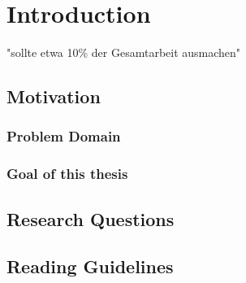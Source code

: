 
\chapter{Introduction} %

\label{ChapterX} %


"sollte etwa 10\% der Gesamtarbeit ausmachen"

\section{Motivation}

\subsection{Problem Domain}

\subsection{Goal of this thesis}

\section{Research Questions}

\section{Reading Guidelines}